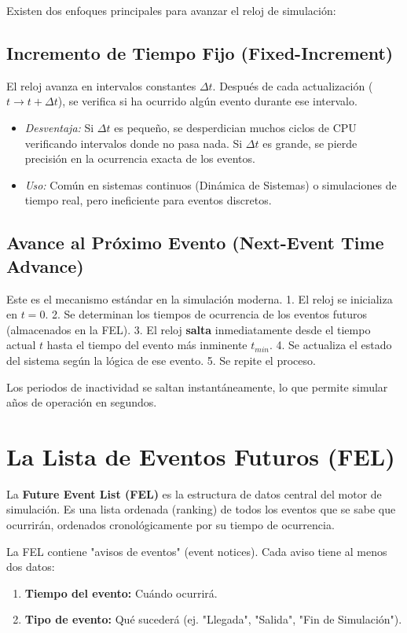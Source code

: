 \documentclass[11pt, letterpaper]{article}
\begin{document}
Existen dos enfoques principales para avanzar el reloj de simulación:

\subsection{Incremento de Tiempo Fijo (Fixed-Increment)}
El reloj avanza en intervalos constantes $\Delta t$. Después de cada actualización ($t \to t + \Delta t$), se verifica si ha ocurrido algún evento durante ese intervalo.
\begin{itemize}
    \item \textit{Desventaja:} Si $\Delta t$ es pequeño, se desperdician muchos ciclos de CPU verificando intervalos donde no pasa nada. Si $\Delta t$ es grande, se pierde precisión en la ocurrencia exacta de los eventos.
    \item \textit{Uso:} Común en sistemas continuos (Dinámica de Sistemas) o simulaciones de tiempo real, pero ineficiente para eventos discretos.
\end{itemize}

\subsection{Avance al Próximo Evento (Next-Event Time Advance)}
Este es el mecanismo estándar en la simulación moderna.
1. El reloj se inicializa en $t=0$.
2. Se determinan los tiempos de ocurrencia de los eventos futuros (almacenados en la FEL).
3. El reloj \textbf{salta} inmediatamente desde el tiempo actual $t$ hasta el tiempo del evento más inminente $t_{min}$.
4. Se actualiza el estado del sistema según la lógica de ese evento.
5. Se repite el proceso.

Los periodos de inactividad se saltan instantáneamente, lo que permite simular años de operación en segundos. 

\section{La Lista de Eventos Futuros (FEL)}

La \textbf{Future Event List (FEL)} es la estructura de datos central del motor de simulación. Es una lista ordenada (ranking) de todos los eventos que se sabe que ocurrirán, ordenados cronológicamente por su tiempo de ocurrencia.

La FEL contiene "avisos de eventos" (event notices). Cada aviso tiene al menos dos datos:
\begin{enumerate}
    \item \textbf{Tiempo del evento:} Cuándo ocurrirá.
    \item \textbf{Tipo de evento:} Qué sucederá (ej. "Llegada", "Salida", "Fin de Simulación").
\end{enumerate}
\end{document}

